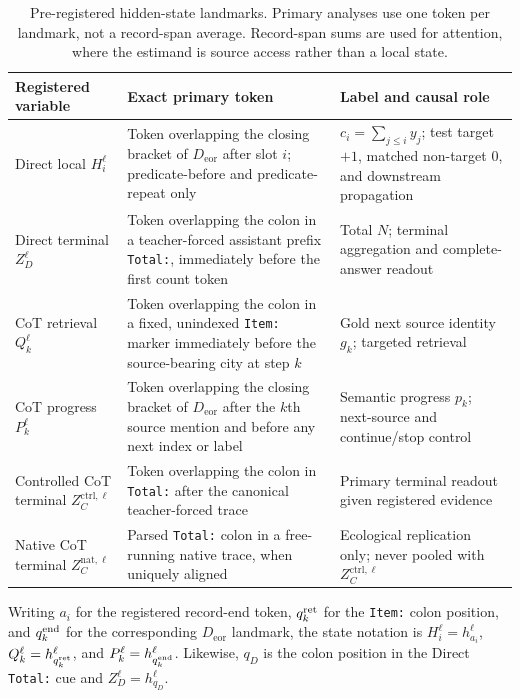 \documentclass[10pt,twocolumn]{article}
\begin{document}
\begin{table}[t]
\centering
\small
\begin{tabularx}{\textwidth}{p{}p{}Y}
\toprule
Registered variable & Exact primary token & Label and causal role \\
\midrule
Direct local $H_i^\ell$ &
Token overlapping the closing bracket of $D_{\mathrm{eor}}$ after slot $i$;
predicate-before and predicate-repeat only &
$c_i=\sum_{j\leq i}y_j$; test target $+1$, matched non-target $0$, and downstream propagation \\
Direct terminal $Z_D^\ell$ &
Token overlapping the colon in a teacher-forced assistant prefix \texttt{Total:}, immediately
before the first count token &
Total $N$; terminal aggregation and complete-answer readout \\
CoT retrieval $Q_k^\ell$ &
Token overlapping the colon in a fixed, unindexed \texttt{Item:} marker immediately before the
source-bearing city at step $k$ &
Gold next source identity $g_k$; targeted retrieval \\
CoT progress $P_k^\ell$ &
Token overlapping the closing bracket of $D_{\mathrm{eor}}$ after the $k$th source mention and
before any next index or label &
Semantic progress $p_k$; next-source and continue/stop control \\
Controlled CoT terminal $Z_C^{\mathrm{ctrl},\ell}$ &
Token overlapping the colon in \texttt{Total:} after the canonical teacher-forced trace &
Primary terminal readout given registered evidence \\
Native CoT terminal $Z_C^{\mathrm{nat},\ell}$ &
Parsed \texttt{Total:} colon in a free-running native trace, when uniquely aligned &
Ecological replication only; never pooled with $Z_C^{\mathrm{ctrl},\ell}$ \\
\bottomrule
\end{tabularx}
\caption{Pre-registered hidden-state landmarks. Primary analyses use one token per landmark,
not a record-span average. Record-span sums are used for attention, where the estimand is source
access rather than a local state.}
\label{tab:landmarks}
\end{table}

Writing $a_i$ for the registered record-end token, $q_k^{\rm ret}$ for the
\texttt{Item:} colon position, and $q_k^{\rm end}$ for the corresponding
$D_{\mathrm{eor}}$ landmark, the state notation is
$H_i^\ell=h_{a_i}^\ell$, $Q_k^\ell=h_{q_k^{\rm ret}}^\ell$, and
$P_k^\ell=h_{q_k^{\rm end}}^\ell$. Likewise, $q_D$ is the colon position in the
Direct \texttt{Total:} cue and $Z_D^\ell=h_{q_D}^\ell$.
\end{document}
